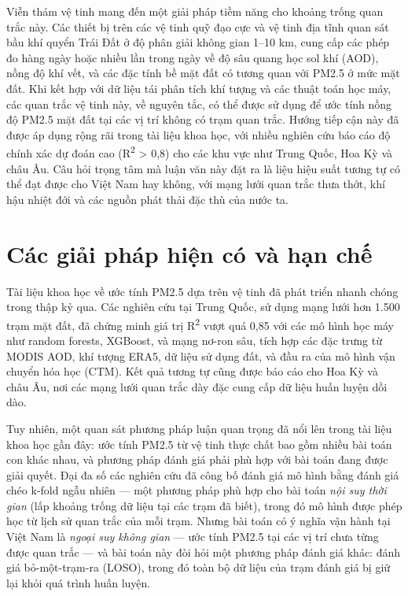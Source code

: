 Viễn thám vệ tinh mang đến một giải pháp tiềm năng cho khoảng trống quan trắc này. Các thiết bị trên các vệ tinh quỹ đạo cực và vệ tinh địa tĩnh quan sát bầu khí quyển Trái Đất ở độ phân giải không gian 1--10 km, cung cấp các phép đo hàng ngày hoặc nhiều lần trong ngày về độ sâu quang học sol khí (AOD), nồng độ khí vết, và các đặc tính bề mặt đất có tương quan với PM2.5 ở mức mặt đất. Khi kết hợp với dữ liệu tái phân tích khí tượng và các thuật toán học máy, các quan trắc vệ tinh này, về nguyên tắc, có thể được sử dụng để ước tính nồng độ PM2.5 mặt đất tại các vị trí không có trạm quan trắc. Hướng tiếp cận này đã được áp dụng rộng rãi trong tài liệu khoa học, với nhiều nghiên cứu báo cáo độ chính xác dự đoán cao (R\textsuperscript{2} > 0,8) cho các khu vực như Trung Quốc, Hoa Kỳ và châu Âu. Câu hỏi trọng tâm mà luận văn này đặt ra là liệu hiệu suất tương tự có thể đạt được cho Việt Nam hay không, với mạng lưới quan trắc thưa thớt, khí hậu nhiệt đới và các nguồn phát thải đặc thù của nước ta.


\section{Các giải pháp hiện có và hạn chế}

Tài liệu khoa học về ước tính PM2.5 dựa trên vệ tinh đã phát triển nhanh chóng trong thập kỷ qua. Các nghiên cứu tại Trung Quốc, sử dụng mạng lưới hơn 1.500 trạm mặt đất, đã chứng minh giá trị R\textsuperscript{2} vượt quá 0,85 với các mô hình học máy như random forests, XGBoost, và mạng nơ-ron sâu, tích hợp các đặc trưng từ MODIS AOD, khí tượng ERA5, dữ liệu sử dụng đất, và đầu ra của mô hình vận chuyển hóa học (CTM). Kết quả tương tự cũng được báo cáo cho Hoa Kỳ và châu Âu, nơi các mạng lưới quan trắc dày đặc cung cấp dữ liệu huấn luyện dồi dào.

Tuy nhiên, một quan sát phương pháp luận quan trọng đã nổi lên trong tài liệu khoa học gần đây: ước tính PM2.5 từ vệ tinh thực chất bao gồm nhiều bài toán con khác nhau, và phương pháp đánh giá phải phù hợp với bài toán đang được giải quyết. Đại đa số các nghiên cứu đã công bố đánh giá mô hình bằng đánh giá chéo k-fold ngẫu nhiên --- một phương pháp phù hợp cho bài toán \emph{nội suy thời gian} (lấp khoảng trống dữ liệu tại các trạm đã biết), trong đó mô hình được phép học từ lịch sử quan trắc của mỗi trạm. Nhưng bài toán có ý nghĩa vận hành tại Việt Nam là \emph{ngoại suy không gian} --- ước tính PM2.5 tại các vị trí chưa từng được quan trắc --- và bài toán này đòi hỏi một phương pháp đánh giá khác: đánh giá bỏ-một-trạm-ra (LOSO), trong đó toàn bộ dữ liệu của trạm đánh giá bị giữ lại khỏi quá trình huấn luyện.

